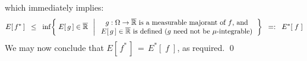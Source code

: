 which immediately implies:
\begin{equation*}
E\!\left[\,f^{*}\,\right]
\;\; \leq \;\;
	\inf\!\left\{\;
		E\!\left[\,g\,\right] \in \overline{\Re}
		\;\;\left\vert\;
		\begin{array}{c}
			\textnormal{$g:\Omega\rightarrow\overline{\Re}$ is a measurable majorant of $f$, and}
			\\
			\textnormal{$E\!\left[\,g\,\right] \in \overline{\Re}$ is defined ($g$ need not be $\mu$-integrable)}
		\end{array}
		\right.
		\right\}
\;\; =: \;\;
	E^{*}\!\left[\;f\;\right]	
\end{equation*}
We may now conclude that $E\!\left[\,f^{*}\,\right] \,=\, E^{*}\!\left[\;f\;\right]$, as required.
\qed


\renewcommand{\theenumi}{\roman{enumi}}
\renewcommand{\labelenumi}{\textnormal{(\theenumi)}$\;\;$}


